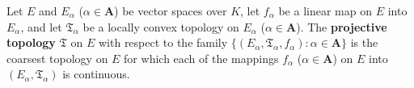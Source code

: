 Let $E$ and $E_\alpha$ ($\alpha \in \mathbf{A}$) be vector spaces over $K$, let $f_\alpha$ be a linear map on $E$ into $E_\alpha$, and let $\mathfrak{T}_\alpha$ be a locally convex topology on $E_\alpha$ ($\alpha \in \mathbf{A}$). The \textbf{projective topology} $\mathfrak{T}$ on $E$ with respect to the family $\{(E_\alpha, \mathfrak{T}_\alpha, f_\alpha): \alpha \in \mathbf{A}\}$ is the coarsest topology on $E$ for which each of the mappings $f_\alpha$ ($\alpha \in \mathbf{A}$) on $E$ into $(E_\alpha, \mathfrak{T}_\alpha)$ is continuous.
